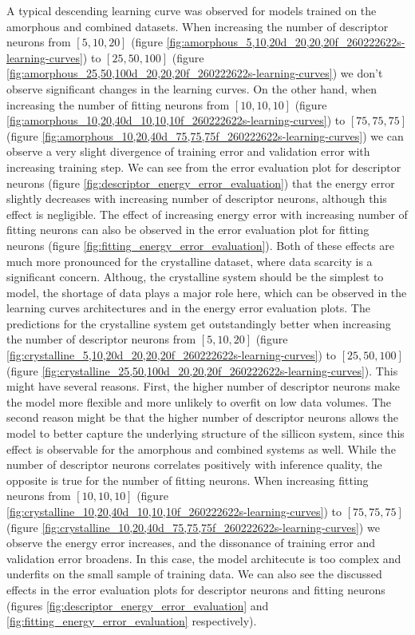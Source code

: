 A typical descending learning curve was observed for models trained on the
amorphous and combined datasets. When increasing the number of descriptor
neurons from $[5, 10, 20]$ (figure
\ref{fig:amorphous_5,10,20d_20,20,20f_260222622s-learning-curves}) to
$[25, 50, 100]$ (figure
\ref{fig:amorphous_25,50,100d_20,20,20f_260222622s-learning-curves}) we don't
observe significant changes in the learning curves. On the other hand, when
increasing the number of fitting neurons from $[10, 10, 10]$
(figure \ref{fig:amorphous_10,20,40d_10,10,10f_260222622s-learning-curves}) to
$[75, 75, 75]$ (figure
\ref{fig:amorphous_10,20,40d_75,75,75f_260222622s-learning-curves}) we can
observe a very slight divergence of training error and validation error with
increasing training step. We can see from the error evaluation plot for
descriptor neurons (figure \ref{fig:descriptor_energy_error_evaluation}) that
the energy error slightly decreases with increasing number of descriptor
neurons, although this effect is negligible. The effect of increasing energy
error with increasing number of fitting neurons can also be observed in the
error evaluation plot for fitting neurons (figure
\ref{fig:fitting_energy_error_evaluation}). Both of these effects are much
more pronounced for the crystalline dataset, where data scarcity is a
significant concern. Althoug, the crystalline system should be the simplest to
model, the shortage of data plays a major role here, which can be observed in
the learning curves architectures and in the energy error evaluation plots.
The predictions for the crystalline system get outstandingly better when
increasing the number of descriptor neurons from $[5, 10, 20]$ (figure
\ref{fig:crystalline_5,10,20d_20,20,20f_260222622s-learning-curves}) to
$[25, 50, 100]$ (figure
\ref{fig:crystalline_25,50,100d_20,20,20f_260222622s-learning-curves}). This
might have several reasons. First, the higher number of descriptor neurons
make the model more flexible and more unlikely to overfit on low data volumes.
The second reason might be that the higher number of descriptor neurons allows
the model to better capture the underlying structure of the sillicon system,
since this effect is observable for the amorphous and combined systems as
well. While the number of descriptor neurons correlates positively with
inference quality, the opposite is true for the number of fitting neurons.
When increasing fitting neurons from $[10, 10, 10]$
(figure \ref{fig:crystalline_10,20,40d_10,10,10f_260222622s-learning-curves})
to $[75, 75, 75]$
(figure \ref{fig:crystalline_10,20,40d_75,75,75f_260222622s-learning-curves})
we observe the energy error increases, and the dissonance of training error
and validation error broadens. In this case, the model architecute is too
complex and underfits on the small sample of training data. We can also see
the discussed effects in the error evaluation plots for descriptor neurons
and fitting neurons (figures \ref{fig:descriptor_energy_error_evaluation} and
\ref{fig:fitting_energy_error_evaluation} respectively).


